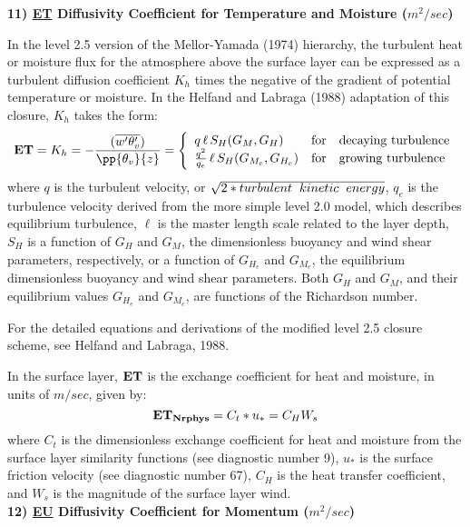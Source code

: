 \noindent
{\bf 11)  \underline {ET}  Diffusivity Coefficient for Temperature and Moisture ($m^2/sec$) }

\noindent
In the level 2.5 version of the Mellor-Yamada (1974) hierarchy, the turbulent heat or
moisture flux for the atmosphere above the surface layer can be expressed as a turbulent 
diffusion coefficient $K_h$ times the negative of the gradient of potential temperature 
or moisture. In the Helfand and Labraga (1988) adaptation of this closure, $K_h$ 
takes the form:
\[
{\bf ET} = K_h = -{( {\overline{w^{\prime}\theta_v^{\prime}}}) \over {\pp{\theta_v}{z}} }
 = \left\{ \begin{array}{l@{\quad\mbox{for}\quad}l} q \, \ell \, S_H(G_M,G_H) & \mbox{decaying turbulence}
\\ { q^2 \over {q_e} } \, \ell \, S_{H}(G_{M_e},G_{H_e}) & \mbox{growing turbulence} \end{array} \right.
\]
where $q$ is the turbulent velocity, or $\sqrt{2*turbulent \hspace{.2cm} kinetic \hspace{.2cm} 
energy}$, $q_e$ is the turbulence velocity derived from the more simple level 2.0 model, 
which describes equilibrium turbulence, $\ell$ is the master length scale related to the layer 
depth, 
$S_H$ is a function of $G_H$ and $G_M$, the dimensionless buoyancy and
wind shear parameters, respectively, or a function of $G_{H_e}$ and $G_{M_e}$, the equilibrium 
dimensionless buoyancy and wind shear
parameters.   Both $G_H$ and $G_M$, and their equilibrium values $G_{H_e}$ and $G_{M_e}$, 
are functions of the Richardson number.

\noindent
For the detailed equations and derivations of the modified level 2.5 closure scheme,
see Helfand and Labraga, 1988.

\noindent
In the surface layer, ${\bf {ET}}$ is the exchange coefficient for heat and moisture,
in units of $m/sec$, given by:
\[
{\bf ET_{Nrphys}} =  C_t * u_* = C_H W_s
\]
\noindent
where $C_t$ is the dimensionless exchange coefficient for heat and moisture from the 
surface layer similarity functions (see diagnostic number 9), $u_*$ is the surface 
friction velocity (see diagnostic number 67), $C_H$ is the heat transfer coefficient,
and $W_s$ is the magnitude of the surface layer wind.
\\
 
\noindent
{\bf 12)  \underline {EU}  Diffusivity Coefficient for Momentum ($m^2/sec$) }
 
